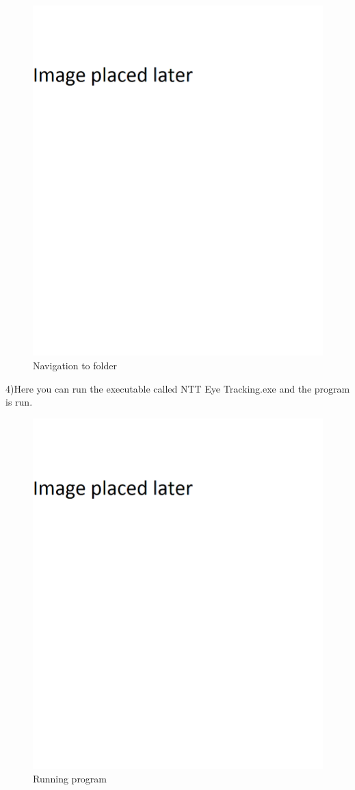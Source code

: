 	\begin{figure}[!ht]
		\centering
		\includegraphics[scale=0.5, width=15cm, keepaspectratio]{./Images/default.png}
		\caption{Navigation to folder}
		\label{Unzip files}
	\end{figure}
	
4)Here you can run the executable called NTT Eye Tracking.exe and the program is run.
	\begin{figure}[!ht]
		\centering
		\includegraphics[scale=0.5, width=15cm, keepaspectratio]{./Images/default.png}
		\caption{Running program}
		\label{Unzip files}
	\end{figure}